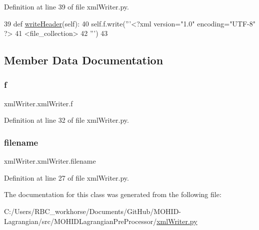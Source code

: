 Definition at line 39 of file xml\+Writer.\+py.


\begin{DoxyCode}
39     \textcolor{keyword}{def }\mbox{\hyperlink{classxml_writer_1_1xml_writer_aa05ece2d045f4be023b005b42e892736}{writeHeader}}(self):
40         self.f.write(\textcolor{stringliteral}{'''<?xml version="1.0" encoding="UTF-8" ?>}
41 \textcolor{stringliteral}{<file\_collection>}
42 \textcolor{stringliteral}{'''})
43 
\end{DoxyCode}


\subsection{Member Data Documentation}
\mbox{\label{classxml_writer_1_1xml_writer_a1ecd576801e94caa6dcc033ceb534111}} 
\subsubsection{\texorpdfstring{f}{f}}
{\footnotesize\ttfamily xml\+Writer.\+xml\+Writer.\+f}



Definition at line 32 of file xml\+Writer.\+py.

\mbox{\label{classxml_writer_1_1xml_writer_a4842af70f50831bd8981fc2be0a9fe01}} 
\subsubsection{\texorpdfstring{filename}{filename}}
{\footnotesize\ttfamily xml\+Writer.\+xml\+Writer.\+filename}



Definition at line 27 of file xml\+Writer.\+py.



The documentation for this class was generated from the following file\+:\begin{DoxyCompactItemize}
\item 
C\+:/\+Users/\+R\+B\+C\+\_\+workhorse/\+Documents/\+Git\+Hub/\+M\+O\+H\+I\+D-\/\+Lagrangian/src/\+M\+O\+H\+I\+D\+Lagrangian\+Pre\+Processor/\mbox{\hyperlink{xml_writer_8py}{xml\+Writer.\+py}}\end{DoxyCompactItemize}
